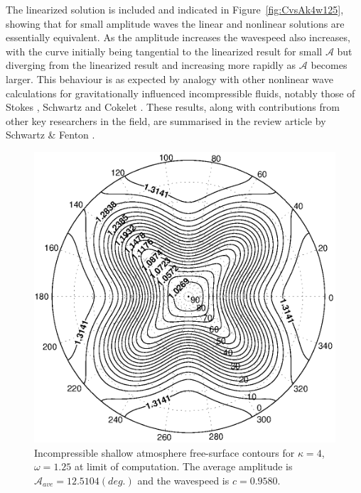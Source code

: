 The linearized solution is included and indicated in Figure~\ref{fig:CvsAk4w125}, showing that for small amplitude waves the linear and nonlinear solutions are essentially equivalent. As the amplitude increases the wavespeed also increases, with the curve initially being tangential to the linearized result for small $\mathcal{A}$ but diverging from the linearized result and increasing more rapidly as $\mathcal{A}$ becomes larger. This behaviour is as expected by analogy with other nonlinear wave calculations for gravitationally influenced incompressible fluids, notably those of Stokes \cite{Stokes:TOW}, Schwartz \cite{Schwartz:CEA} and Cokelet \cite{Cokelet:SGW}. These results, along with contributions from other key researchers in the field, are summarised in the review article by Schwartz \& Fenton \cite{Schwartz:SNW}.
\begin{figure}[htbp]
	\centering
		\includegraphics[scale=0.75]{IMAGES/k4w125fsend.eps}
	\caption{Incompressible shallow atmosphere free-surface contours for $\kappa=4$, $\omega=1.25$ at limit of computation. The average amplitude is $\mathcal{A}_{ave}=12.5104 (deg.)$ and the wavespeed is $c=0.9580$.}
	\label{fig:k4w125fsend}
\end{figure}

